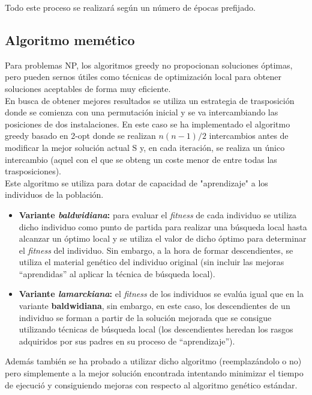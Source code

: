 Todo este proceso se realizará según un número de épocas prefijado.
	
\subsection{Algoritmo memético}

Para problemas NP, los algoritmos greedy no propocionan soluciones óptimas, pero pueden sernos útiles como técnicas de optimización local para obtener soluciones aceptables de forma muy eficiente.\\

En busca de obtener mejores resultados se utiliza un estrategia de trasposición donde se comienza con una permutación inicial y se va intercambiando las posiciones de dos instalaciones. En este caso se ha implementado el algoritmo greedy basado en 2-opt donde se realizan $n(n-1)/2$ intercambios antes de modificar la mejor solución actual S y, en cada iteración, se realiza un único intercambio (aquel con el que se obteng un coste menor de entre todas las trasposiciones). \\

Este algoritmo se utiliza para dotar de capacidad de "aprendizaje" a los individuos de la población.

\begin{itemize}
	\item \textbf{Variante \textit{baldwidiana}:} para evaluar el \textit{fitness} de cada individuo se utiliza dicho individuo como punto de partida para realizar una búsqueda local hasta alcanzar un óptimo local y se utiliza el valor de dicho óptimo para determinar el \textit{fitness} del individuo. Sin embargo, a la hora de formar descendientes, se utiliza el material genético del individuo original (sin incluir las mejoras ``aprendidas'' al aplicar la técnica de búsqueda local).
	
	\item \textbf{Variante \textit{lamarckiana}:} el \textit{fitness} de los individuos se evalúa igual que en la variante \textbf{baldwidiana}, sin embargo, en este caso, los descendientes de un individuo se forman a partir de la solución mejorada que se consigue utilizando técnicas de búsqueda local (los descendientes heredan los rasgos adquiridos por sus padres en su proceso de ``aprendizaje'').
\end{itemize}

Además también se ha probado a utilizar dicho algoritmo (reemplazándolo o no) pero simplemente a la mejor solución encontrada intentando minimizar el tiempo de ejecució y consiguiendo mejoras con respecto al algoritmo genético estándar.

